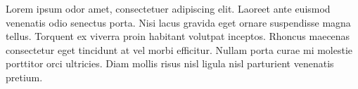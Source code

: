 Lorem ipsum odor amet, consectetuer adipiscing elit. Laoreet ante euismod
venenatis odio senectus porta. Nisi lacus gravida eget ornare suspendisse magna
tellus. Torquent ex viverra proin habitant volutpat inceptos. Rhoncus maecenas
consectetur eget tincidunt at vel morbi efficitur. Nullam porta curae mi
molestie porttitor orci ultricies. Diam mollis risus nisl ligula nisl
parturient venenatis pretium.
